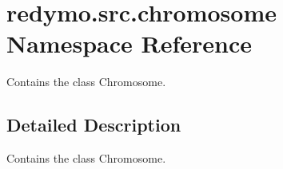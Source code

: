 \hypertarget{namespaceredymo_1_1src_1_1chromosome}{}\section{redymo.\+src.\+chromosome Namespace Reference}
\label{namespaceredymo_1_1src_1_1chromosome}


Contains the class Chromosome.  




\subsection{Detailed Description}
Contains the class Chromosome. 

